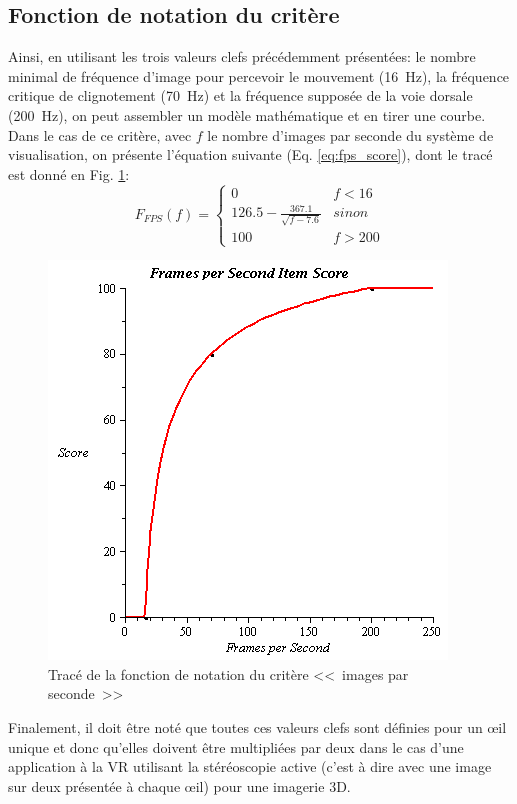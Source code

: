	\subsection{Fonction de notation du critère}
	\par Ainsi, en utilisant les trois valeurs clefs précédemment présentées: le nombre minimal de fréquence d'image pour percevoir le mouvement (16~Hz), la fréquence critique de clignotement (70~Hz) et la fréquence supposée de la voie dorsale (200~Hz), on peut assembler un modèle mathématique et en tirer une courbe. Dans le cas de ce critère, avec $f$ le nombre d'images par seconde du système de visualisation, on présente l'équation suivante (Eq. \ref{eq:fps_score}), dont le tracé est donné en Fig. \ref{fig:score_fps}:
	\begin{equation}
		F_{FPS}(f) = \begin{cases}
		0 & f < 16\\
		126.5 - \frac{367.1}{\sqrt{f - 7.6}} & sinon\\
		100 & f > 200
		\end{cases}
		\label{eq:fps_score}
	\end{equation}

	\begin{figure}
		\centering
		\includegraphics[scale=.75]{Figures/FPS}
		\caption{Tracé de la fonction de notation du critère <<~images par seconde~>>}
		\label{fig:score_fps}
	\end{figure}

	\par Finalement, il doit être noté que toutes ces valeurs clefs sont définies pour un œil unique et donc qu'elles doivent être multipliées par deux dans le cas d'une application à la VR utilisant la stéréoscopie active (c'est à dire avec une image sur deux présentée à chaque œil) pour une imagerie 3D. %
	
